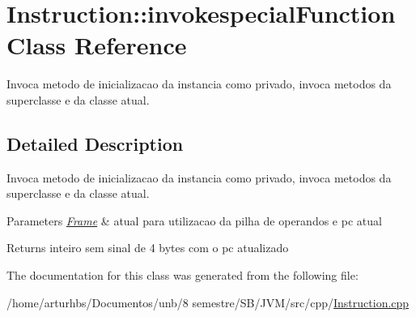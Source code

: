 \hypertarget{classInstruction_1_1invokespecialFunction}{}\section{Instruction\+:\+:invokespecial\+Function Class Reference}
\label{classInstruction_1_1invokespecialFunction}


Invoca metodo de inicializacao da instancia como privado, invoca metodos da superclasse e da classe atual.  




\subsection{Detailed Description}
Invoca metodo de inicializacao da instancia como privado, invoca metodos da superclasse e da classe atual. 


\begin{DoxyParams}{Parameters}
{\em \hyperlink{classFrame}{Frame}} & atual para utilizacao da pilha de operandos e pc atual \\
\hline
\end{DoxyParams}
\begin{DoxyReturn}{Returns}
inteiro sem sinal de 4 bytes com o pc atualizado 
\end{DoxyReturn}


The documentation for this class was generated from the following file\+:\begin{DoxyCompactItemize}
\item 
/home/arturhbs/\+Documentos/unb/8 semestre/\+S\+B/\+J\+V\+M/src/cpp/\hyperlink{Instruction_8cpp}{Instruction.\+cpp}\end{DoxyCompactItemize}
